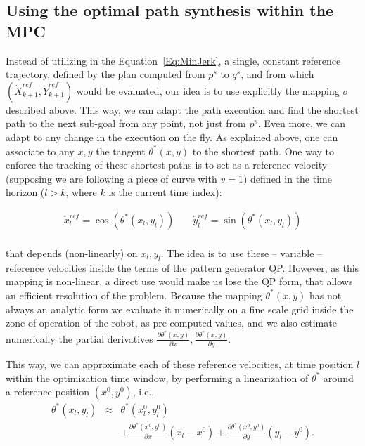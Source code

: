 \subsection{Using the optimal path synthesis within the MPC}

Instead of utilizing in the Equation~\ref{Eq:MinJerk}, a single, constant reference trajectory, defined by the plan computed from $p^s$ to $q^s$, and from which $(\dot{X}_{k+1}^{ref},\dot{Y}_{k+1}^{ref})$ would be evaluated, our idea is to use explicitly the mapping $\sigma$ described above. This way, we can adapt the path execution and find the shortest path to the next sub-goal from any point, not just from $p^s$. Even more, we can adapt to any change in the execution on the fly. As explained above, one can  associate to any $x,y$ the tangent $\theta^*(x,y)$ to the shortest path. One way to enforce the tracking of these shortest paths is to set as a reference velocity (supposing we are following a piece of curve with $v=1$) defined in the time horizon ($l>k$, where $k$ is the current time index):

$$
\begin{array}{ccc}
\dot{x}^{ref}_l =  \cos(\theta^*(x_l,y_l)) & \; & \dot{y}^{ref}_l =  \sin(\theta^*(x_l,y_l)) \\
\end{array}
$$

that depends (non-linearly) on $x_l,y_l$. The idea is to use these -- variable -- reference velocities inside the terms of the pattern generator QP. However, as this mapping is non-linear, a direct use would make us lose the QP form, that allows an efficient resolution of the problem. Because the mapping $\theta^*(x,y)$ has not always an analytic form we evaluate it numerically on a fine scale grid inside the zone of operation of the robot, as pre-computed values, and we also estimate numerically the partial derivatives $\frac{\partial \theta^*(x,y)}{\partial x},  \frac{\partial \theta^*(x,y)}{\partial y}$.

This way, we can approximate each of these reference velocities, at time position $l$ within the optimization time window, by performing a linearization of $\theta^*$  around a reference position $(x^0,y^0)$, i.e.,
$$
\begin{array}{ccc}
\theta^*(x_l,y_l) & \approx & \theta^*(x^0_l,y^0_l)  \\
& & + \frac{\partial \theta^*(x^0,y^0)}{\partial x} (x_l-x^0) + \frac{\partial \theta^*(x^0,y^0)}{\partial y} (y_l-y^0).
\end{array}
$$

